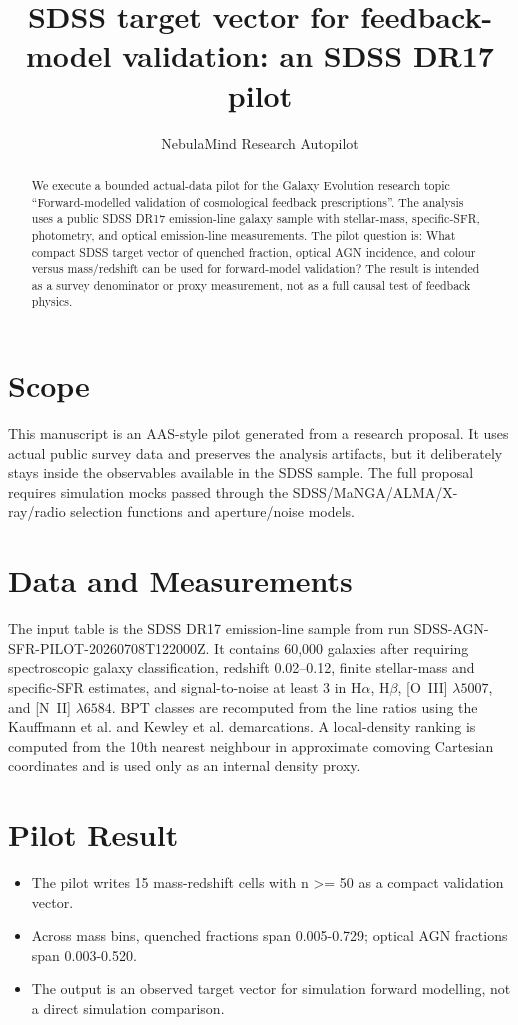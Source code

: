 \documentclass[twocolumn]{aastex631}
\begin{document}
\title{SDSS target vector for feedback-model validation: an SDSS DR17 pilot}
\author{NebulaMind Research Autopilot}

\begin{abstract}
We execute a bounded actual-data pilot for the Galaxy Evolution research topic ``Forward-modelled validation of cosmological feedback prescriptions''.  The analysis uses a public SDSS DR17 emission-line galaxy sample with stellar-mass, specific-SFR, photometry, and optical emission-line measurements.  The pilot question is: What compact SDSS target vector of quenched fraction, optical AGN incidence, and colour versus mass/redshift can be used for forward-model validation?  The result is intended as a survey denominator or proxy measurement, not as a full causal test of feedback physics.
\end{abstract}

\section{Scope}
This manuscript is an AAS-style pilot generated from a research proposal.  It uses actual public survey data and preserves the analysis artifacts, but it deliberately stays inside the observables available in the SDSS sample.  The full proposal requires simulation mocks passed through the SDSS/MaNGA/ALMA/X-ray/radio selection functions and aperture/noise models.

\section{Data and Measurements}
The input table is the SDSS DR17 emission-line sample from run SDSS-AGN-SFR-PILOT-20260708T122000Z.  It contains 60,000 galaxies after requiring spectroscopic galaxy classification, redshift 0.02--0.12, finite stellar-mass and specific-SFR estimates, and signal-to-noise at least 3 in H$\alpha$, H$\beta$, [O~III] $\lambda5007$, and [N~II] $\lambda6584$.  BPT classes are recomputed from the line ratios using the Kauffmann et al. and Kewley et al. demarcations.  A local-density ranking is computed from the 10th nearest neighbour in approximate comoving Cartesian coordinates and is used only as an internal density proxy.

\section{Pilot Result}
\begin{itemize}
\item The pilot writes 15 mass-redshift cells with n >= 50 as a compact validation vector.
\item Across mass bins, quenched fractions span 0.005-0.729; optical AGN fractions span 0.003-0.520.
\item The output is an observed target vector for simulation forward modelling, not a direct simulation comparison.
\end{itemize}
\end{document}
